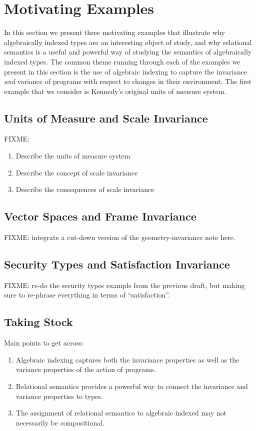 \section{Motivating Examples}
\label{sec:motivating-examples}

In this section we present three motivating examples that illustrate
why algebraically indexed types are an interesting object of study,
and why relational semantics is a useful and powerful way of studying
the semantics of algebraically indexed types. The common theme running
through each of the examples we present in this section is the use of
algebraic indexing to capture the invariance \emph{and} variance of
programs with respect to changes in their environment. The first
example that we consider is Kennedy's original units of measure
system.

\subsection{Units of Measure and Scale Invariance}
\label{sec:units-of-measure-example-intro}

FIXME:
\begin{enumerate}
\item Describe the units of measure system
\item Describe the concept of scale invariance
\item Describe the consequences of scale invariance
\end{enumerate}

\subsection{Vector Spaces and Frame Invariance}
\label{sec:vector-spaces-intro}

FIXME: integrate a cut-down version of the geometry-invariance note
here.

\subsection{Security Types and Satisfaction Invariance}
\label{sec:security-types-intro}

FIXME: re-do the security types example from the previous draft, but
making sure to re-phrase everything in terms of ``satisfaction''.

\subsection{Taking Stock}
\label{sec:taking-stock}

Main points to get across:
\begin{enumerate}
\item Algebraic indexing captures both the invariance properties as
  well as the variance properties of the action of programs.
\item Relational semantics provides a powerful way to connect the
  invariance and variance properties to types.
\item The assignment of relational semantics to algebraic indexed may
  not necessarily be compositional.
\end{enumerate}


